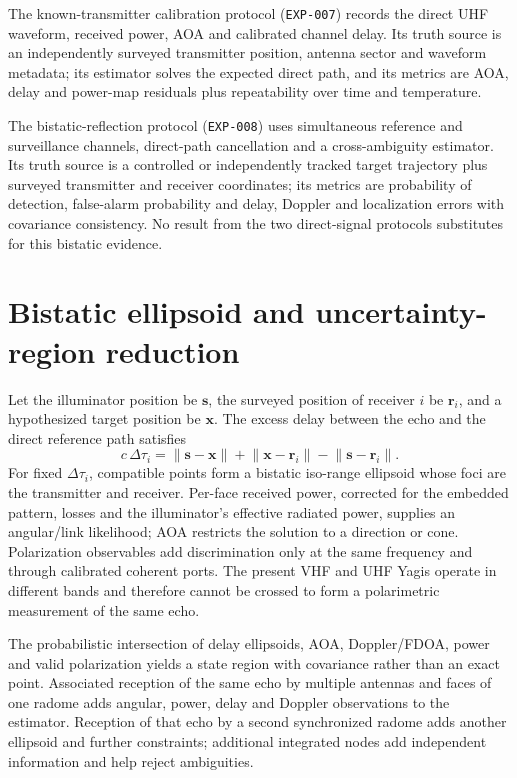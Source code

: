 The known-transmitter calibration protocol (\texttt{EXP-007}) records the direct UHF waveform, received power, AOA and calibrated channel delay. Its truth source is an independently surveyed transmitter position, antenna sector and waveform metadata; its estimator solves the expected direct path, and its metrics are AOA, delay and power-map residuals plus repeatability over time and temperature.

The bistatic-reflection protocol (\texttt{EXP-008}) uses simultaneous reference and surveillance channels, direct-path cancellation and a cross-ambiguity estimator. Its truth source is a controlled or independently tracked target trajectory plus surveyed transmitter and receiver coordinates; its metrics are probability of detection, false-alarm probability and delay, Doppler and localization errors with covariance consistency. No result from the two direct-signal protocols substitutes for this bistatic evidence.

\section{Bistatic ellipsoid and uncertainty-region reduction}
Let the illuminator position be $\mathbf{s}$, the surveyed position of receiver $i$ be $\mathbf{r}_i$, and a hypothesized target position be $\mathbf{x}$. The excess delay between the echo and the direct reference path satisfies
\[
c\,\Delta\tau_i=
\lVert\mathbf{s}-\mathbf{x}\rVert+
\lVert\mathbf{x}-\mathbf{r}_i\rVert-
\lVert\mathbf{s}-\mathbf{r}_i\rVert.
\]
For fixed $\Delta\tau_i$, compatible points form a bistatic iso-range ellipsoid whose foci are the transmitter and receiver. Per-face received power, corrected for the embedded pattern, losses and the illuminator's effective radiated power, supplies an angular/link likelihood; AOA restricts the solution to a direction or cone. Polarization observables add discrimination only at the same frequency and through calibrated coherent ports. The present VHF and UHF Yagis operate in different bands and therefore cannot be crossed to form a polarimetric measurement of the same echo.

The probabilistic intersection of delay ellipsoids, AOA, Doppler/FDOA, power and valid polarization yields a state region with covariance rather than an exact point. Associated reception of the same echo by multiple antennas and faces of one radome adds angular, power, delay and Doppler observations to the estimator. Reception of that echo by a second synchronized radome adds another ellipsoid and further constraints; additional integrated nodes add independent information and help reject ambiguities.

